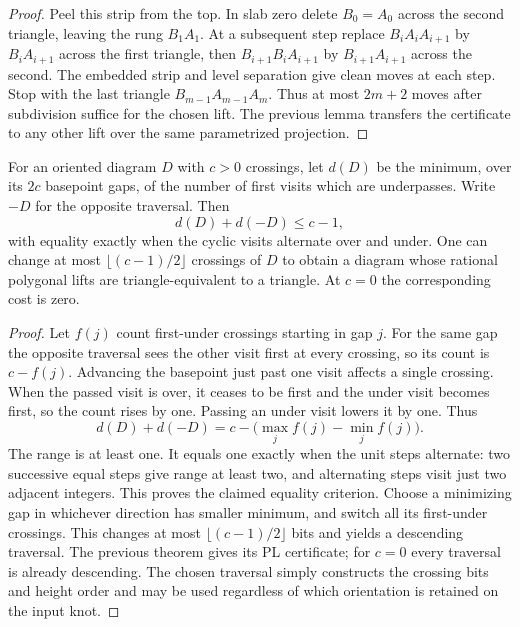 \begin{proof}
Peel this strip from the top. In slab zero delete $B_0=A_0$ across the
second triangle, leaving the rung $B_1A_1$. At a subsequent step replace
$B_i A_i A_{i+1}$ by $B_i A_{i+1}$ across the first triangle, then
$B_{i+1}B_i A_{i+1}$ by $B_{i+1}A_{i+1}$ across the second. The embedded
strip and level separation give clean moves at each step. Stop with
the last triangle $B_{m-1}A_{m-1}A_m$. Thus at most $2m+2$ moves after
subdivision suffice for the chosen lift. The previous lemma transfers
the certificate to any other lift over the same parametrized projection.
\end{proof}

\begin{theorem}
For an oriented diagram $D$ with $c>0$ crossings, let $d(D)$ be the
minimum, over its $2c$ basepoint gaps, of the number of first visits
which are underpasses. Write $-D$ for the opposite traversal. Then
\[
                d(D)+d(-D)\le c-1,
\]
with equality exactly when the cyclic visits alternate over and under.
One can change at most $\lfloor(c-1)/2\rfloor$ crossings of $D$ to
obtain a diagram whose rational polygonal lifts are triangle-equivalent
to a triangle. At $c=0$ the corresponding cost is zero.
\end{theorem}
\begin{proof}
Let $f(j)$ count first-under crossings starting in gap $j$. For the same
gap the opposite traversal sees the other visit first at every crossing,
so its count is $c-f(j)$. Advancing the basepoint just past one visit
affects a single crossing. When the passed visit is over, it ceases to
be first and the under visit becomes first, so the count rises by one.
Passing an under visit lowers it by one. Thus
\[
 d(D)+d(-D)=c-\bigl(\max_j f(j)-\min_j f(j)\bigr).
\]
The range is at least one. It equals one exactly when the unit steps
alternate: two successive equal steps give range at least two, and
alternating steps visit just two adjacent integers. This proves the
claimed equality criterion. Choose a minimizing gap in whichever
direction has smaller minimum, and switch all its first-under
crossings. This changes at most $\lfloor(c-1)/2\rfloor$ bits and yields
a descending traversal. The previous theorem gives its PL certificate;
for $c=0$ every traversal is already descending. The chosen traversal
simply constructs the crossing bits and height order and may be used
regardless of which orientation is retained on the input knot.
\end{proof}

